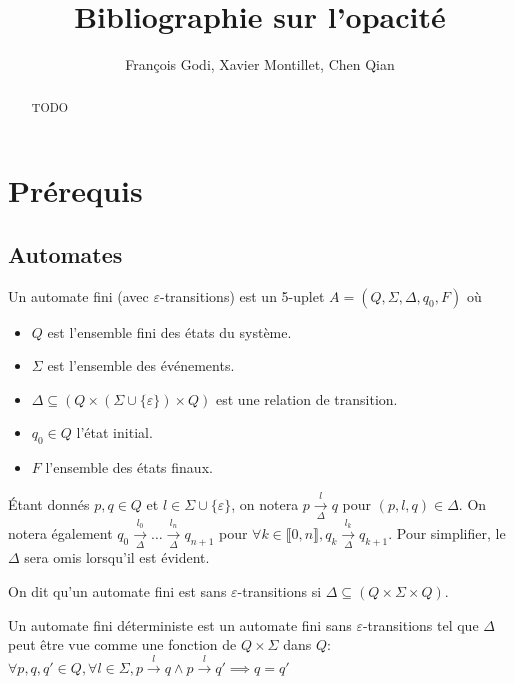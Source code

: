 \documentclass[10pt,a4paper]{article}
\newcommand{\enum}[2]{\llbracket #1, #2 \rrbracket}
\begin{document}
    \title{Bibliographie sur l'opacit\'e}

    \author{François Godi, Xavier Montillet, Chen Qian}

\maketitle

\begin{abstract}
TODO
\end{abstract}

\section{Pr\'erequis}

\subsection{Automates}

Un automate fini (avec $\varepsilon$-transitions) est un 5-uplet $A = (Q, \Sigma, \Delta, q_0, F)$ o\`u
\begin{itemize}
	\item $Q$ est l'ensemble fini des états du système.
	\item $\Sigma$ est l'ensemble des événements.
	\item $\Delta \subseteq (Q \times (\Sigma \cup \{\varepsilon\}) \times Q)$ est une relation de transition.
	\item $q_0 \in Q$ l'état initial.
	\item $F$ l'ensemble des \'etats finaux.
\end{itemize}

\'Etant donn\'es $p,q \in Q$ et $l\in \Sigma \cup \{\varepsilon\}$, on notera $p \underset{\Delta}{\overset{l}{{\to}}}q$ pour $(p,l,q) \in \Delta$. On notera \'egalement $q_0 \underset{\Delta}{\overset{l_0}{{\to}}} \dots \underset{\Delta}{\overset{l_n}{{\to}}} q_{n+1}$ pour $\forall k \in \enum{0}{n}, q_k 
\underset{\Delta}{\overset{l_k}{{\to}}} q_{k+1}$. Pour simplifier, le $\Delta$ sera omis lorsqu'il est \'evident.



On dit qu'un automate fini est sans $\varepsilon$-transitions si $\Delta \subseteq (Q\times \Sigma \times Q)$.

Un automate fini d\'eterministe est un automate fini sans $\varepsilon$-transitions tel que $\Delta$ peut \^etre vue comme une fonction de $Q\times \Sigma$ dans $Q$: $\forall p,q,q' \in Q, \forall l \in \Sigma, p\overset{l}{{\to}}q \land p\overset{l}{{\to}}q' \implies q=q'$
\end{document}
